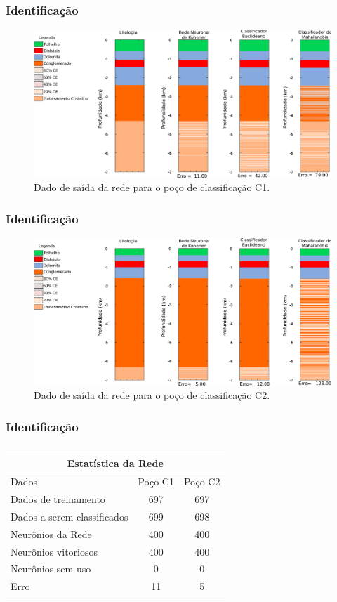 \documentclass[aspectratio=10]{beamer} %
\begin{document}
\begin{frame}
\frametitle{Identificação}
\begin{figure}[H]
\centering
\includegraphics[scale=0.3]{Imagens/IDC1020118.png}
\caption{Dado de saída da rede para o poço de classificação C1.}
\label{Class C1}
\end{figure} 
\end{frame}

\begin{frame}
\frametitle{Identificação}
\begin{figure}[H]
\centering
\includegraphics[scale=0.3]{Imagens/IDC2020118.png}
\caption{Dado de saída da rede para o poço de classificação C2.}
\label{Class C2}
\end{figure} 
\end{frame}

\begin{frame}
	\frametitle{Identificação}
\begin{table}[H]
	\centering
	\caption{}
	\label{Estatistica da rede}
	\begin{tabular}{@{}lcc@{}}
		\toprule
		\multicolumn{3}{c}{Estatística da Rede}         \\ \midrule
		Dados                       & Poço C1 & Poço C2 \\
		Dados de treinamento        & 697     & 697     \\
		Dados a serem classificados & 699     & 698     \\
		Neurônios da Rede           & 400     & 400     \\
		Neurônios vitoriosos        & 400     & 400     \\
		Neurônios sem uso           & 0       & 0       \\
		Erro                        & 11      & 5       \\ \bottomrule
	\end{tabular}
\end{table} 
\end{frame}
\end{document}
